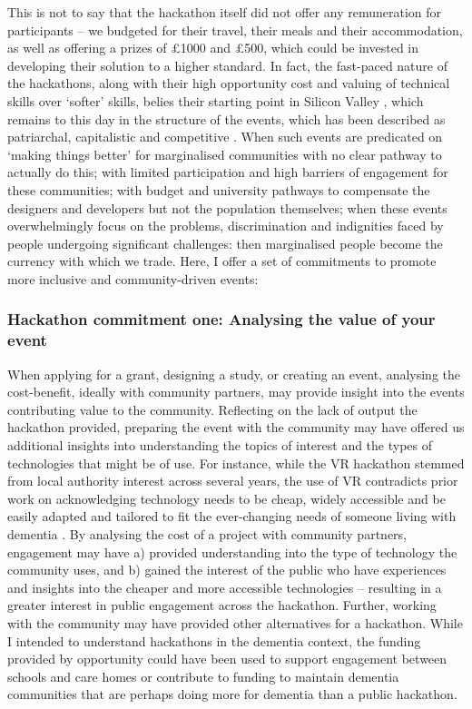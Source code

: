 This is not to say that the hackathon itself did not offer any remuneration for participants – we budgeted for their travel, their meals and their accommodation, as well as offering a prizes of £1000 and £500, which could be invested in developing their solution to a higher standard. In fact, the fast-paced nature of the hackathons, along with their high opportunity cost and valuing of technical skills over `softer' skills, belies their starting point in Silicon Valley  \citep{irani_hackathons_2015}, which remains to this day in the structure of the events, which has been described as patriarchal, capitalistic and competitive \citep{evans_disruption_2018}. When such events are predicated on `making things better' for marginalised communities with no clear pathway to actually do this; with limited participation and high barriers of engagement for these communities; with budget and university pathways to compensate the designers and developers but not the population themselves; when these events overwhelmingly focus on the problems, discrimination and indignities faced by people undergoing significant challenges: then marginalised people become the currency with which we trade. Here, I offer a set of commitments to promote more inclusive and community-driven events:

\subsubsection{Hackathon commitment one: Analysing the value of your event}
\label{DiscussionThree:CommitOne}
When applying for a grant, designing a study, or creating an event, analysing the cost-benefit, ideally with community partners, may provide insight into the events contributing value to the community. Reflecting on the lack of output the hackathon provided, preparing the event with the community may have offered us additional insights into understanding the topics of interest and the types of technologies that might be of use. For instance, while the VR hackathon stemmed from local authority interest across several years, the use of VR contradicts prior work on acknowledging technology needs to be cheap, widely accessible and be easily adapted and tailored to fit the ever-changing needs of someone living with dementia \citep{lorenz2019technology}. By analysing the cost of a project with community partners, engagement may have a) provided understanding into the type of technology the community uses, and b) gained the interest of the public who have experiences and insights into the cheaper and more accessible technologies – resulting in a greater interest in public engagement across the hackathon. Further, working with the community may have provided other alternatives for a hackathon. While I intended to understand hackathons in the dementia context, the funding provided by opportunity could have been used to support engagement between schools and care homes or contribute to funding to maintain dementia communities that are perhaps doing more for dementia than a public hackathon.

